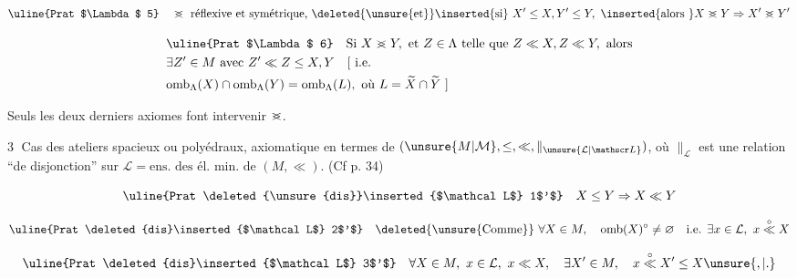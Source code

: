 \[
\text{\uline{Prat $\Lambda$ 5}}\quad\mathrel{>\mkern-13mu<}\ \text{réflexive et symétrique, \deleted{\unsure{et}}\inserted{si} }X'\leq X,Y'\leq Y,\ \inserted{\text{alors }}X\mathrel{>\mkern-13mu<}Y\Rightarrow X'\mathrel{>\mkern-13mu<}Y'
\]

\[
\begin{aligned}
&\text{\uline{Prat $\Lambda$ 6}}\quad \text{Si } X\mathrel{>\mkern-13mu<}Y,\ \text{et }Z\in\Lambda\ \text{telle que }Z\ll X,Z\ll Y,\ \text{alors}\\
&\exists Z'\in M\ \text{avec } Z'\ll Z\leq X,Y\quad [\ \text{i.e.}\\
&\mathrm{omb}_{\Lambda}(X)\cap\mathrm{omb}_{\Lambda}(Y)=\mathrm{omb}_{\Lambda}(L),\ \text{où }L=\widetilde X\cap\widetilde Y\ ]
\end{aligned}
\]



Seuls les deux derniers axiomes font intervenir $\mathrel{>\mkern-13mu<}$.


\textcircled{3} Cas des ateliers spacieux ou polyédraux, axiomatique en termes de $(\unsure{M|\mathcal M},\leq,\ll,\parallel_{\unsure{\mathcal L|\mathscr L}})$, où $\parallel_{\mathcal L}$ est une relation ``de disjonction'' sur $\mathcal L={}\text{ens. des él. min. de }(M,\ll)$. (Cf p. 34)

\margin{[Prat dis 1 à Prat dis 5 comme Prat $\unsure{\Lambda|\wedge}$ 1 à Prat $\Lambda$ 5, avec $\Lambda=\mathcal L$]}


\[
\text{\uline{Prat \deleted{\unsure{dis}}\inserted{$\mathcal L$} 1$'$}}\quad X\leq Y\Rightarrow X\ll Y
\]

\[
\text{\uline{Prat \deleted{dis}\inserted{$\mathcal L$} 2$'$}}\quad \text{\deleted{\unsure{Comme}} }\forall X\in M,\quad \mathrm{omb}(X)^{\circ}\ne\varnothing\quad \text{i.e. }\exists x\in\mathcal L,\ x\overset{\circ}{\ll}X
\]

\[
\text{\uline{Prat \deleted{dis}\inserted{$\mathcal L$} 3$'$}}\quad \forall X\in M,\ x\in\mathcal L,\ x\ll X,\quad \exists X'\in M,\quad x\overset{\circ}{\ll}X'\leq X\unsure{,|.}
\]

